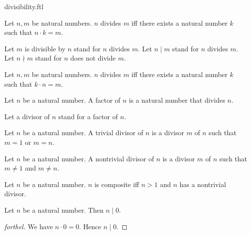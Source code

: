 \documentclass{naproche-library}
\begin{document}
\begin{smodule}[title=Divisibility]{divisibility.ftl}

\begin{definition}[forthel,id=ARITHMETIC_07_4239998993825792]
  Let $n, m$ be natural numbers.
  $n$ divides $m$ iff there exists a natural number $k$ such that $n \cdot k = m$.

  Let $m$ is divisible by $n$ stand for $n$ divides $m$.
  Let $n \mid m$ stand for $n$ divides $m$.
  Let $n \nmid m$ stand for $n$ does not divide $m$.
\end{definition}

\begin{lemma}[forthel,id=ARITHMETIC_07_1478855118290944]
  Let $n, m$ be natural numbers.
  $n$ divides $m$ iff there exists a natural number $k$ such that $k \cdot n = m$.
\end{lemma}

\begin{definition}[forthel,id=ARITHMETIC_07_1311437490225152]
  Let $n$ be a natural number.
  A factor of $n$ is a natural number that divides $n$.

  Let a divisor of $n$ stand for a factor of $n$.
\end{definition}

\begin{definition}[forthel,id=ARITHMETIC_10_5438991513944064]
  Let $n$ be a natural number.
  A trivial divisor of $n$ is a divisor $m$ of $n$ such that $m = 1$ or $m = n$.
\end{definition}

\begin{definition}[forthel,id=ARITHMETIC_10_8768240253665280]
  Let $n$ be a natural number.
  A nontrivial divisor of $n$ is a divisor $m$ of $n$ such that $m \neq 1$ and $m \neq n$.
\end{definition}

\begin{definition}[forthel,id=ARITHMETIC_10_8020087063707648]
  Let $n$ be a natural number.
  $n$ is composite iff $n > 1$ and $n$ has a nontrivial divisor.
\end{definition}

\begin{proposition}[forthel,id=ARITHMETIC_07_2242720387039232]
  Let $n$ be a natural number.
  Then $n \mid 0$.
\end{proposition}
\begin{proof}[forthel]
  We have $n \cdot 0 = 0$.
  Hence $n \mid 0$.
\end{proof}


\end{smodule}
\end{document}
